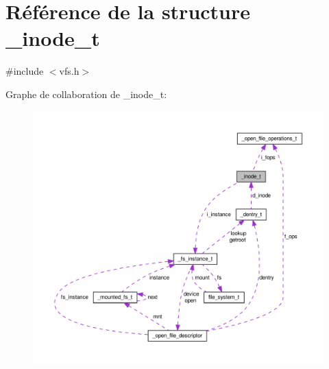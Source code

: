 \hypertarget{struct__inode__t}{\section{\-Référence de la structure \-\_\-inode\-\_\-t}
\label{struct__inode__t}
}


{\ttfamily \#include $<$vfs.\-h$>$}



\-Graphe de collaboration de \-\_\-inode\-\_\-t\-:\nopagebreak
\begin{figure}[H]
\begin{center}
\leavevmode
\includegraphics[width=350pt]{struct__inode__t__coll__graph}
\end{center}
\end{figure}
